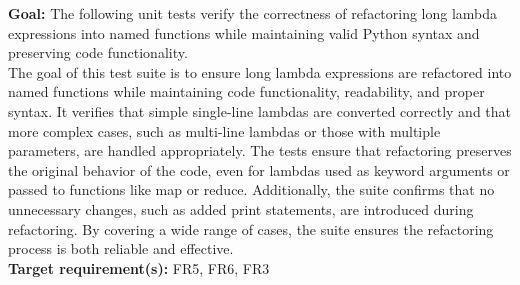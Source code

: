 \documentclass[12pt, titlepage]{article}
\begin{document}
\textbf{Goal:} The following unit tests verify the correctness of refactoring long lambda expressions into named functions while maintaining valid Python syntax and preserving code functionality.\\

\noindent The goal of this test suite is to ensure long lambda expressions are refactored into named 
functions while maintaining code functionality, readability, and proper syntax. It verifies 
that simple single-line lambdas are converted correctly and that more complex cases, such as 
multi-line lambdas or those with multiple parameters, are handled appropriately. The tests 
ensure that refactoring preserves the original behavior of the code, even for lambdas used 
as keyword arguments or passed to functions like map or reduce. Additionally, the suite 
confirms that no unnecessary changes, such as added print statements, are introduced during 
refactoring. By covering a wide range of cases, the suite ensures the refactoring process
 is both reliable and effective.\\

\noindent \textbf{Target requirement(s):} FR5, FR6, FR3 ~\cite{SRS} \\
\end{document}
